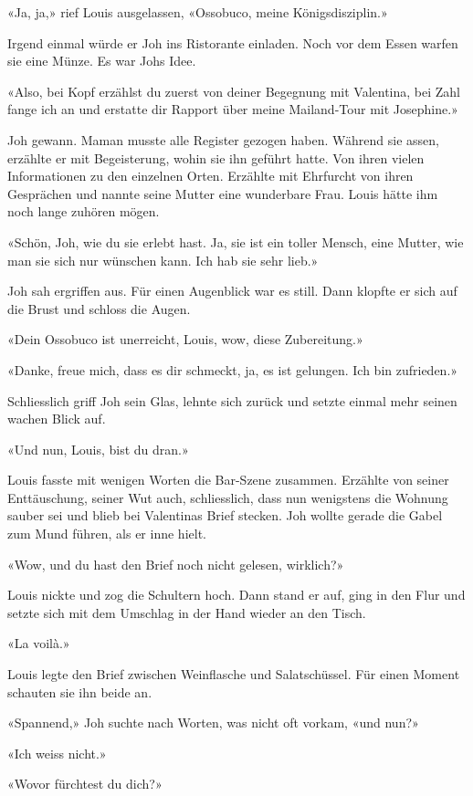 «Ja, ja,» rief Louis ausgelassen, «Ossobuco, meine Königsdisziplin.»

Irgend einmal würde er Joh ins Ristorante einladen. Noch vor dem Essen warfen sie eine Münze. Es war Johs
Idee.

«Also, bei Kopf erzählst du zuerst von deiner Begegnung mit Valentina, bei Zahl fange ich an und erstatte dir Rapport über meine Mailand-Tour mit Josephine.»

Joh gewann. Maman musste alle Register gezogen haben. Während sie 
assen, erzählte er mit Begeisterung, wohin sie ihn geführt hatte. 
Von ihren vielen Informationen zu den einzelnen Orten. Erzählte mit Ehrfurcht von ihren
Gesprächen und nannte seine Mutter eine wunderbare Frau. Louis hätte ihm
noch lange zuhören mögen.

«Schön, Joh, wie du sie erlebt hast. Ja, sie ist ein toller Mensch, eine 
Mutter, wie man sie sich nur wünschen kann. Ich hab sie sehr lieb.»

Joh sah ergriffen aus. Für einen Augenblick war es still.
Dann klopfte er sich auf die Brust und schloss die Augen.

«Dein Ossobuco ist unerreicht, Louis, wow, diese Zubereitung.»

«Danke, freue mich, dass es dir schmeckt, ja, es ist gelungen. Ich bin zufrieden.»

Schliesslich griff Joh sein Glas, lehnte sich zurück und setzte einmal mehr seinen wachen Blick auf.

«Und nun, Louis, bist du dran.»

Louis fasste mit wenigen Worten die Bar-Szene zusammen. Erzählte von
seiner Enttäuschung, seiner Wut auch, schliesslich, dass nun wenigstens
die Wohnung sauber sei und blieb bei Valentinas Brief stecken.
Joh wollte gerade die Gabel zum Mund führen, als er inne hielt. 

«Wow, und du hast den Brief noch nicht gelesen, wirklich?»

Louis nickte und zog die Schultern hoch.
Dann stand er auf, ging in den Flur und setzte sich mit dem Umschlag in
der Hand wieder an den Tisch.

«La voilà.»

Louis legte den Brief zwischen Weinflasche und Salatschüssel.
Für einen Moment schauten sie ihn beide an.

«Spannend,» Joh suchte nach Worten, was nicht oft vorkam, «und nun?»

«Ich weiss nicht.»

«Wovor fürchtest du dich?»

